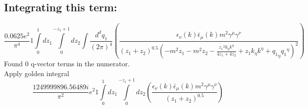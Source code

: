 \subsection*{Integrating this term:}
\begin{dmath}\frac{0.0625 e^{2}}{\pi^{4}}1\int\limits_{ 0 }^{ 1 } d{ z_{ 1 } }\int\limits_{ 0 }^{ - { z_{ 1 } } + 1 } d{ z_{ 2 } }\int\frac{d^d q_1 }{ (2\pi)^4 }\left(\frac{\epsilon_{ \nu }({ k }) \bar{\epsilon}_{ \mu }({ k }) m^{2} { \gamma^{ \mu } } { \gamma^{ \nu } }}{\left({ z_{ 1 } } + { z_{ 2 } }\right)^{0.5} \left(- m^{2} { z_{ 1 } } - m^{2} { z_{ 2 } } - \frac{{ z_{ 1 } }^{2} { { k }_{ \eta } } { { k }^{ \eta } }}{4 { z_{ 1 } } + 4 { z_{ 2 } }} + { z_{ 1 } } { { k }_{ \eta } } { { k }^{ \eta } } + { { q_1 }_{ \eta } } { { q_1 }^{ \eta } }\right)^{2}}\right)\end{dmath}
Found 0 q-vector terms in the numerator.\\
Apply golden integral
\begin{dmath}\frac{1249999896.56489 i}{\pi^{2}} e^{2}1\int\limits_{ 0 }^{ 1 } d{ z_{ 1 } }\int\limits_{ 0 }^{ - { z_{ 1 } } + 1 } d{ z_{ 2 } }\left(\frac{\epsilon_{ \nu }({ k }) \bar{\epsilon}_{ \mu }({ k }) m^{2} { \gamma^{ \mu } } { \gamma^{ \nu } }}{\left({ z_{ 1 } } + { z_{ 2 } }\right)^{0.5}}\right)\end{dmath}
